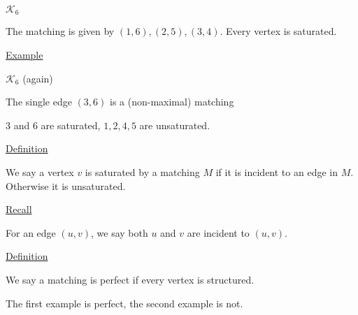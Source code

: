 \documentclass{article}
\begin{document}
$\mathcal{K}_6$

\begin{center}
\end{center}



The matching is given by $(1,6),(2,5),(3,4)$. Every vertex is saturated. 


\underline{Example}

$\mathcal{K}_6$ (again)

\begin{center}
\end{center}

The single edge $(3,6)$ is a (non-maximal) matching

$3$ and $6$ are saturated, $1,2,4,5$ are unsaturated. 

\underline{Definition}

We say a vertex $v$ is saturated by a matching $M$ if it is incident to an edge in $M$. Otherwise it is unsaturated. 

\underline{Recall}

For an edge $(u,v)$, we say both $u$ and $v$ are incident to $(u,v)$. 

\underline{Definition}

We say a matching is perfect if every vertex is structured. 

The first example is perfect, the second example is not. 
\end{document}
